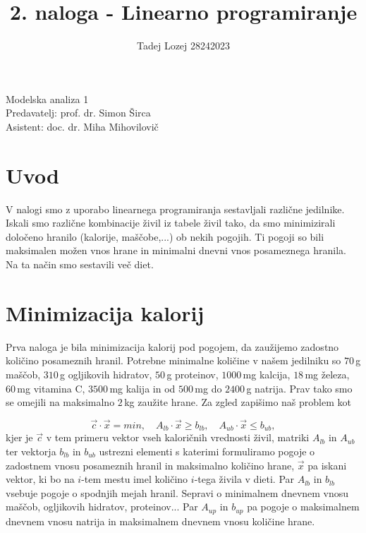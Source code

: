 \documentclass[slovene,11pt,a4paper]{article}
\begin{document}
\title{2. naloga - Linearno programiranje}
\author{Tadej Lozej 28242023}
\maketitle
\begin{center}
Modelska analiza 1 \\
\bigskip
Predavatelj: prof. dr. Simon Širca \\
Asistent: doc. dr. Miha Mihovilovič
\end{center}

\newpage

\tableofcontents

\newpage

\section{Uvod}


V nalogi smo z uporabo linearnega programiranja sestavljali različne jedilnike. Iskali smo različne kombinacije živil iz tabele živil tako, da smo minimizirali določeno hranilo (kalorije, maščobe,...) ob nekih pogojih. Ti pogoji so bili maksimalen možen vnos hrane in minimalni dnevni vnos posameznega hranila. Na ta način smo sestavili več diet.

\section{Minimizacija kalorij}

Prva naloga je bila minimizacija kalorij pod pogojem, da zaužijemo zadostno količino posameznih hranil. Potrebne minimalne količine v našem jedilniku so $70\,$g maščob, $310\,$g ogljikovih hidratov, $50\,$g proteinov, $1000\,$mg kalcija, $18\,$mg železa, $60\,$mg vitamina C, $3500\,$mg kalija in od $500\,$mg do $2400\,$g natrija. Prav tako smo se omejili na maksimalno $2\,$kg zaužite hrane. Za zgled zapišimo naš problem kot

\[
\vec{c}\cdot \vec{x} = min, \quad A_{lb} \cdot \vec{x} \geq b_{lb}, \quad A_{ub} \cdot \vec{x} \leq b_{ub},
\]
kjer je $\vec{c}$ v tem primeru vektor vseh kaloričnih vrednosti živil, matriki $A_{lb}$ in $A_{ub}$ ter vektorja $b_{lb}$ in $b_{ub}$ ustrezni elementi s katerimi formuliramo pogoje o zadostnem vnosu posameznih hranil in maksimalno količino hrane, $\vec{x}$ pa iskani vektor, ki bo na $i$-tem mestu imel količino $i$-tega živila v dieti. Par $A_{lb}$ in $b_{lb}$ vsebuje pogoje o spodnjih mejah hranil. Sepravi o minimalnem dnevnem vnosu maščob, ogljikovih hidratov, proteinov... Par $A_{up}$ in $b_{up}$ pa pogoje o maksimalnem dnevnem vnosu natrija in maksimalnem dnevnem vnosu količine hrane.
\end{document}
